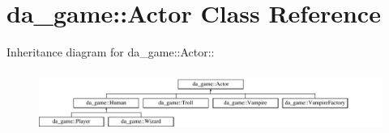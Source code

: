 \hypertarget{classda__game_1_1Actor}{
\section{da\_\-game::Actor Class Reference}
\label{classda__game_1_1Actor}
}
Inheritance diagram for da\_\-game::Actor::\begin{figure}[H]
\begin{center}
\leavevmode
\includegraphics[height=2cm]{classda__game_1_1Actor}
\end{center}
\end{figure}
